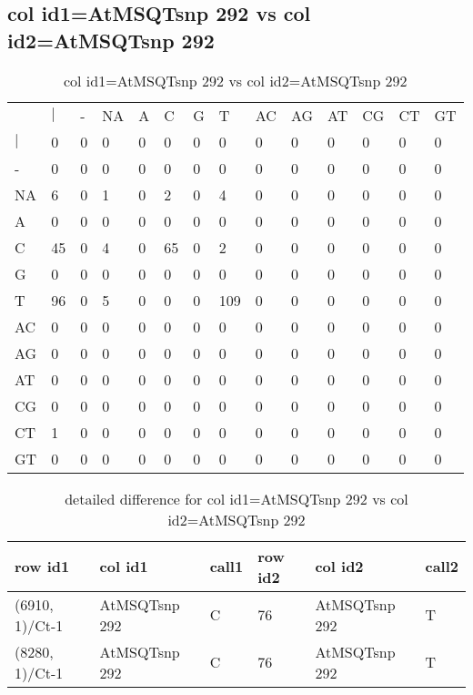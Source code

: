 \subsection{col id1=AtMSQTsnp 292 vs col id2=AtMSQTsnp 292}
\begin{center}
\begin{longtable}{|l|l|l|l|l|l|l|l|l|l|l|l|l|l|}
\caption{col id1=AtMSQTsnp 292 vs col id2=AtMSQTsnp 292} \label{table_dm828}\\
\hline
\\
\hline
&$|$&-&NA&A&C&G&T&AC&AG&AT&CG&CT&GT\\
$|$&0&0&0&0&0&0&0&0&0&0&0&0&0\\
-&0&0&0&0&0&0&0&0&0&0&0&0&0\\
NA&6&0&1&0&2&0&4&0&0&0&0&0&0\\
A&0&0&0&0&0&0&0&0&0&0&0&0&0\\
C&45&0&4&0&65&0&2&0&0&0&0&0&0\\
G&0&0&0&0&0&0&0&0&0&0&0&0&0\\
T&96&0&5&0&0&0&109&0&0&0&0&0&0\\
AC&0&0&0&0&0&0&0&0&0&0&0&0&0\\
AG&0&0&0&0&0&0&0&0&0&0&0&0&0\\
AT&0&0&0&0&0&0&0&0&0&0&0&0&0\\
CG&0&0&0&0&0&0&0&0&0&0&0&0&0\\
CT&1&0&0&0&0&0&0&0&0&0&0&0&0\\
GT&0&0&0&0&0&0&0&0&0&0&0&0&0\\
\hline
\end{longtable}
\end{center}

\begin{center}
\begin{longtable}{|l|l|l|l|l|l|}
\caption{detailed difference for col id1=AtMSQTsnp 292 vs col id2=AtMSQTsnp 292} \label{table_dm829}\\
\hline
row id1&col id1&call1&row id2&col id2&call2\\
\hline
(6910, 1)/Ct-1&AtMSQTsnp 292&C&76&AtMSQTsnp 292&T\\
(8280, 1)/Ct-1&AtMSQTsnp 292&C&76&AtMSQTsnp 292&T\\
\hline
\end{longtable}
\end{center}

